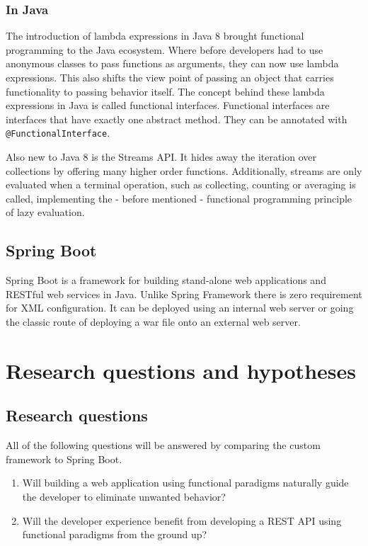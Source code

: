 \documentclass[a4paper]{article}
\begin{document}
\subsubsection{In Java}

The introduction of lambda expressions in Java 8 brought functional programming to the Java ecosystem.
Where before developers had to use anonymous classes to pass functions as arguments, they can now
use lambda expressions. This also shifts the view point of passing an object that carries functionality
to passing behavior itself. The concept behind these lambda expressions in Java is called functional interfaces.
Functional interfaces are interfaces that have exactly one abstract method. They can be annotated with \verb|@FunctionalInterface|.\newline

\noindent Also new to Java 8 is the Streams API. It hides away the iteration over collections by offering
many higher order functions. Additionally, streams are only evaluated when a terminal operation, such as
collecting, counting or averaging is called, implementing the - before mentioned -
functional programming principle of lazy evaluation. \cite{warburton2014java}

\subsection{Spring Boot}

Spring Boot is a framework for building stand-alone web applications and RESTful web services in Java.
Unlike Spring Framework there is zero requirement for XML configuration. It can be deployed using an internal web server
or going the classic route of deploying a war file onto an external web server. \cite{webb2013spring}

\section{Research questions and hypotheses}
\subsection{Research questions}

All of the following questions will be answered by comparing the custom framework to Spring Boot.

\begin{enumerate}
	\item Will building a web application using functional paradigms naturally guide the developer to
	      eliminate unwanted behavior?
	\item Will the developer experience benefit from developing a REST API using
	      functional paradigms from the ground up?
\end{enumerate}
\end{document}
